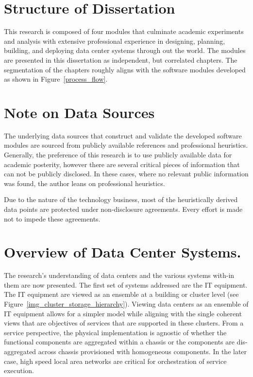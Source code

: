 \section{Structure of Dissertation}
\label{sec: structure}
    This research is composed of four modules that culminate academic experiments and analysis with extensive professional experience in designing, planning, building, and deploying data center systems through out the world. The modules are presented in this dissertation as independent, but correlated chapters. The segmentation of the chapters roughly aligns with the software modules developed as shown in Figure~\ref{process_flow}.
    
    
    
\section{Note on Data Sources}
\label{sec: data source}
    The underlying data sources that construct and validate the developed software modules are sourced from publicly available references and professional heuristics. Generally, the preference of this research is to use publicly available data for academic posterity, however there are several critical pieces of information that can not be publicly disclosed. In these cases, where no relevant public information was found, the author leans on professional heuristics. 
    
    Due to the nature of the technology business, most of the heuristically derived data points are protected under non-disclosure agreements. Every effort is made not to impede these agreements.

\section{Overview of Data Center Systems.}
\label{sec: overview}
    The research's understanding of data centers and the various systems with-in them are now presented. The first set of systems addressed are the IT equipment. The IT equipment are viewed as an ensemble at a building or cluster level (see Figure~\ref{img_cluster_storage_hierarchy}). Viewing data centers as an ensemble of IT equipment allows for a simpler model while aligning with the single coherent views that are objectives of services that are supported in these clusters. From a service perspective, the physical implementation is agnostic of whether the functional components are aggregated within a chassis or the components are dis-aggregated across chassis provisioned with homogeneous components. In the later case, high speed local area networks are critical for orchestration of service execution. 
    
